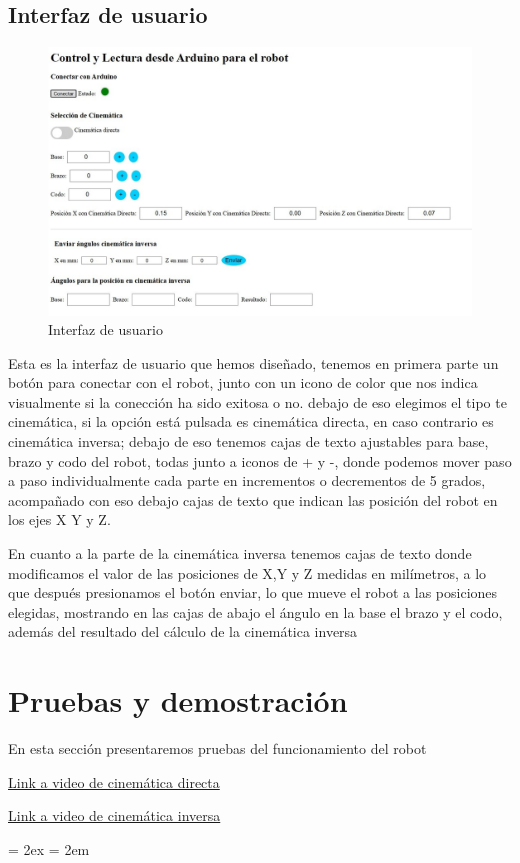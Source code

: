 \documentclass[11pt]{article}
\begin{document}
\subsection{Interfaz de usuario}
\begin{figure}[H]
    \centering
    \includegraphics[width=0.8\linewidth]{figuras/interfaz.jpeg}
    \caption{Interfaz de usuario}
\end{figure}

Esta es la interfaz de usuario que hemos diseñado, tenemos en primera parte un botón para conectar con el robot, junto con un icono de color que nos indica visualmente si la conección ha sido exitosa o no. debajo de eso elegimos el tipo te cinemática, si la opción está pulsada es cinemática directa, en caso contrario es cinemática inversa; debajo de eso tenemos cajas de texto ajustables para base, brazo y codo del robot, todas junto a iconos de + y -, donde podemos mover paso a paso individualmente cada parte en incrementos o decrementos de 5 grados, acompañado con eso debajo cajas de texto que indican las posición del robot en los ejes X Y y Z.

En cuanto a la parte de la cinemática inversa tenemos cajas de texto donde modificamos el valor de las posiciones de X,Y y Z medidas en milímetros, a lo que después presionamos el botón enviar, lo que mueve el robot a las posiciones elegidas, mostrando en las cajas de abajo el ángulo en la base el brazo y el codo, además del resultado del cálculo de la cinemática inversa
\section{Pruebas y demostración}
\label{sec:pruebas}
En esta sección presentaremos pruebas del funcionamiento del robot



\href{https://www.youtube.com/watch?v=iHJcyHrV9w0}{Link a video de cinemática directa}

\href{https://www.youtube.com/watch?v=igmchIDxLEQ}{Link a video de cinemática inversa}


\bibitemsep = 2ex
\bibhang = 2em


\end{document}
